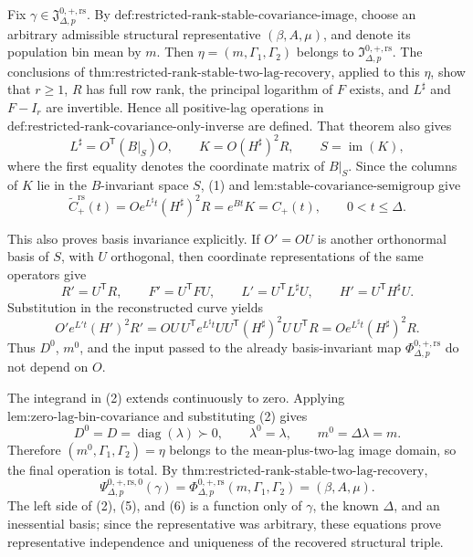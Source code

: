 Fix \(\gamma\in\mathfrak J_{\Delta,p}^{0,+,\mathrm{rs}}\).  By \(\text{def:restricted-rank-stable-covariance-image}\), choose an arbitrary admissible structural representative \((\beta,A,\mu)\), and denote its population bin mean by \(m\).  Then \(\eta=(m,\Gamma_1,\Gamma_2)\) belongs to \(\mathfrak I_{\Delta,p}^{0,+,\mathrm{rs}}\).  The conclusions of \(\text{thm:restricted-rank-stable-two-lag-recovery}\), applied to this \(\eta\), show that \(r\geq1\), \(R\) has full row rank, the principal logarithm of \(F\) exists, and \(L^\sharp\) and \(F-I_r\) are invertible.  Hence all positive-lag operations in \(\text{def:restricted-rank-covariance-only-inverse}\) are defined.  That theorem also gives
\[
 L^\sharp=O^{\mathsf T}(B|_S)O,\qquad
 K=O(H^\sharp)^2R,\qquad S=\operatorname{im}(K),
\tag{1}
\]
where the first equality denotes the coordinate matrix of \(B|_S\).  Since the columns of \(K\) lie in the \(B\)-invariant space \(S\), (1) and \(\text{lem:stable-covariance-semigroup}\) give
\[
 \widetilde C_{+}^{\mathrm{rs}}(t)
 =Oe^{L^\sharp t}(H^\sharp)^2R
 =e^{Bt}K=C_{+}(t),
 \qquad 0<t\leq\Delta.
\tag{2}
\]

This also proves basis invariance explicitly.  If \(O'=OU\) is another orthonormal basis of \(S\), with \(U\) orthogonal, then coordinate representations of the same operators give
\[
 R'=U^{\mathsf T}R,\qquad
 F'=U^{\mathsf T}FU,\qquad
 L'=U^{\mathsf T}L^\sharp U,\qquad
 H'=U^{\mathsf T}H^\sharp U.
\tag{3}
\]
Substitution in the reconstructed curve yields
\[
 O'e^{L't}(H')^2R'
 =OU\,U^{\mathsf T}e^{L^\sharp t}U
   U^{\mathsf T}(H^\sharp)^2U\,U^{\mathsf T}R
 =Oe^{L^\sharp t}(H^\sharp)^2R.
\tag{4}
\]
Thus \(D^0\), \(m^0\), and the input passed to the already basis-invariant map \(\Phi_{\Delta,p}^{0,+,\mathrm{rs}}\) do not depend on \(O\).

The integrand in (2) extends continuously to zero.  Applying \(\text{lem:zero-lag-bin-covariance}\) and substituting (2) gives
\[
 D^0=D=\operatorname{diag}(\lambda)\succ0,\qquad
 \lambda^0=\lambda,\qquad m^0=\Delta\lambda=m.
\tag{5}
\]
Therefore \((m^0,\Gamma_1,\Gamma_2)=\eta\) belongs to the mean-plus-two-lag image domain, so the final operation is total.  By \(\text{thm:restricted-rank-stable-two-lag-recovery}\),
\[
 \Psi_{\Delta,p}^{0,+,\mathrm{rs},0}(\gamma)
 =\Phi_{\Delta,p}^{0,+,\mathrm{rs}}(m,\Gamma_1,\Gamma_2)
 =(\beta,A,\mu).
\tag{6}
\]
The left side of (2), (5), and (6) is a function only of \(\gamma\), the known \(\Delta\), and an inessential basis; since the representative was arbitrary, these equations prove representative independence and uniqueness of the recovered structural triple.

